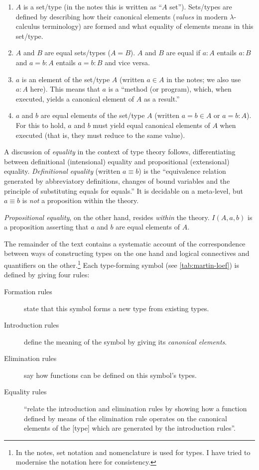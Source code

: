 \documentclass[12pt,toc=bibliography,numbers=noendperiod,
               footnotes=multiple,twoside]{scrartcl}
\begin{document}
\begin{enumerate}
\item \(A\) is a set/type (in the notes this is written as \enquote{\(A\) set}). Sets/types are defined by describing how their canonical elements (\emph{values} in modern \(\lambda\)-calculus terminology) are formed and what equality of elements means in this set/type.
\item \(A\) and \(B\) are equal sets/types (\(A = B\)). \(A\) and \(B\) are equal if \(a : A\) entails \(a : B\) and \(a = b : A\) entails \(a = b : B\) and vice versa.
\item \(a\) is an element of the set/type \(A\) (written \(a \in A\) in the notes; we also use \(a : A\) here). This means that \(a\) is a \enquote{method (or program), which, when executed, yields a canonical element of \(A\) as a result.}
\item \(a\) and \(b\) are equal elements of the set/type \(A\) (written \(a = b \in A\) or \(a = b : A\)). For this to hold, \(a\) and \(b\) must yield equal canonical elements of \(A\) when executed (that is, they must reduce to the same value).
\end{enumerate}

A discussion of \emph{equality} in the context of type theory follows, differentiating between definitional (intensional) equality and propositional (extensional) equality. \emph{Definitional equality} (written \(a \equiv b\)) is the \enquote{equivalence relation generated by abbreviatory definitions, changes of bound variables and the principle of substituting equals for equals.} It is decidable on a meta-level, but \(a \equiv b\) is \emph{not} a proposition within the theory.

\emph{Propositional equality}, on the other hand, resides \emph{within} the theory. \(I(A, a, b)\) is a proposition asserting that \(a\) and \(b\) are equal elements of \(A\).

The remainder of the text contains a systematic account of the correspondence between ways of constructing types on the one hand and logical connectives and quantifiers on the other.\footnote{In the notes, set notation and nomenclature is used for types. I have tried to modernise the notation here for consistency.} Each type-forming symbol (see \cref{tab:martin-loef}) is defined by giving four rules:

\begin{description}
\item[Formation rules] state that this symbol forms a new type from existing types.
\item[Introduction rules] define the meaning of the symbol by giving its \emph{canonical elements}.
\item[Elimination rules] say how functions can be defined on this symbol's types.
\item[Equality rules] \enquote{relate the introduction and elimination rules by showing how a function defined by means of the elimination rule operates on the canonical elements of the [type] which are generated by the introduction rules}.
\end{description}
\end{document}

